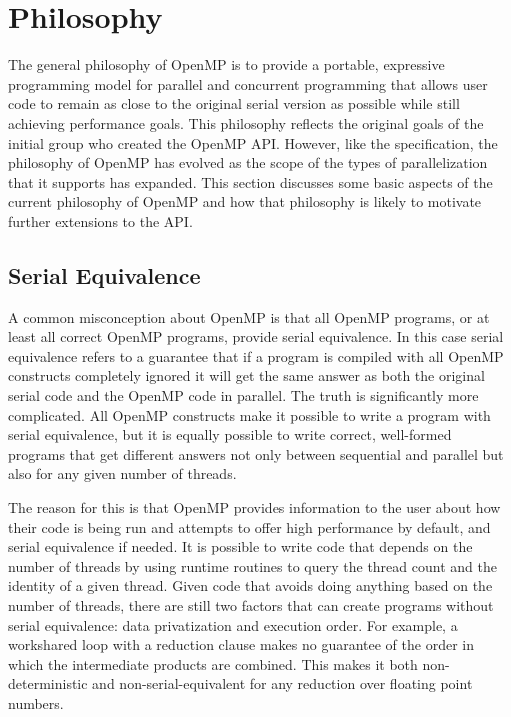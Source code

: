 \section{Philosophy}
\label{sec:philosophy}

The general philosophy of OpenMP is to provide a portable, expressive
programming model for parallel and concurrent programming that allows 
user code to remain as close to the original serial version as 
possible while still achieving performance goals. This philosophy reflects
the original goals of the initial group who created the OpenMP API. However,
like the specification, the philosophy of OpenMP has evolved as the scope
of the types of parallelization that it supports has expanded. This section
discusses some basic aspects of the current philosophy of OpenMP and how 
that philosophy is likely to motivate further extensions to the API.

\subsection{Serial Equivalence}
\label{sub:serial_equivalence}

A common misconception about OpenMP is that all OpenMP programs, or at least all
correct OpenMP programs, provide serial equivalence. In this case serial
equivalence refers to a guarantee that if a program is compiled with all OpenMP
constructs completely ignored it will get the same answer as both the original
serial code and the OpenMP code in parallel.  The truth is significantly more
complicated.  All OpenMP constructs make it possible to write a program with
serial equivalence, but it is equally possible to write correct, well-formed
programs that get different answers not only between sequential and parallel but
also for any given number of threads.

The reason for this is that OpenMP provides information to the user about how
their code is being run and attempts to offer high performance by default, and
serial equivalence if needed.  It is possible to write code that depends on the
number of threads by using runtime routines to query the thread count and the
identity of a given thread.  Given code that avoids doing anything based on the
number of threads, there are still two factors that can create programs without
serial equivalence: data privatization and execution order.  For example, a
workshared loop with a reduction clause makes no guarantee of the order in which
the intermediate products are combined.  This makes it both non-deterministic
and non-serial-equivalent for any reduction over floating point numbers.

